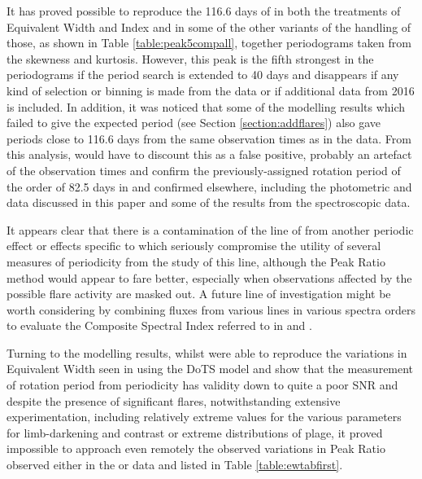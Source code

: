 It has proved possible to reproduce the 116.6 days of \citet[Table 3]{suarezmascareno15} in both the treatments of
Equivalent Width and {\ha} Index and in some of the other variants of the handling of those, as shown in Table
\ref{table:peak5compall}, together periodograms taken from the skewness and kurtosis. However, this peak is the fifth
strongest in the periodograms if the period search is extended to 40 days and disappears if any kind of selection or
binning is made from the data or if additional data from 2016 is included. In addition, it was noticed that some of the
modelling results which failed to give the expected period (see Section \ref{section:addflares}) also gave periods close
to 116.6 days from the same observation times as in the {\harps} data. From this analysis, {\Firstp} would have to
discount this as a false positive, probably an artefact of the observation times and confirm the previously-assigned
rotation period of the order of 82.5 days in \citet{benedict98} and confirmed elsewhere, including the photometric
{\asas} and {\hst} data discussed in this paper and some of the results from the spectroscopic data.

It appears clear that there is a contamination of the {\ha} line of {\prox} from another periodic effect or effects
specific to {\ha} which seriously compromise the utility of several measures of periodicity from the study of this line,
although the Peak Ratio method would appear to fare better, especially when observations affected by the possible flare
activity are masked out.
A future line of investigation might be worth considering by combining fluxes from various lines in various spectra
orders to evaluate the Composite Spectral Index referred to in \citet{hall99} and \citet{hall00}.

Turning to the modelling results, whilst {\Firstp} were able to reproduce the variations in Equivalent Width seen in
{\prox} using the DoTS model and show that the measurement of rotation period from periodicity has validity down to
quite a poor SNR and despite the presence of significant flares, notwithstanding extensive experimentation, including
relatively extreme values for the various parameters for limb-darkening and contrast or extreme distributions of plage,
it proved impossible to approach even remotely the observed variations in Peak Ratio observed either in the {\harps} or
{\uves} data and listed in Table \ref{table:ewtabfirst}.

